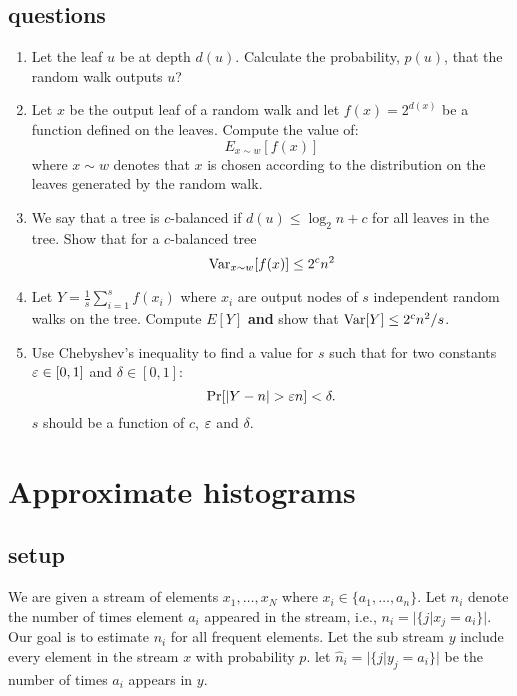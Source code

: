 \documentclass{article}
\begin{document}
\subsection*{questions}
\begin{enumerate}
\item Let the leaf $u$ be at depth $d(u)$. Calculate the
probability, $p(u)$, that the random walk outputs $u$?
\item Let $x$ be the output leaf of a random walk and let $f(x) =
2^{d(x)}$ be a function defined on the leaves. Compute the value of:
\[
E_{x\sim w}[f(x)]
\]
where $x\sim w$ denotes that $x$ is chosen according to the
distribution on the leaves generated by the random walk.
\item We say that a tree is $c$-balanced if $d(u) \le \log_2{n} + c$ for all leaves in the tree.
Show that for a $c$-balanced tree
\[
{\operatorname{Var}}_{x\sim w}[f(x)] \le 2^{c}n^2
\]
\item Let $Y = \frac{1}{s}\sum_{i=1}^{s}f(x_i)$ where $x_i$ are
output nodes of $s$ independent random walks on the tree. Compute
$E[Y]$ {\bf and} show that ${\operatorname{Var}}[Y] \le 2^{c}n^2/s$.
\item Use Chebyshev's inequality to find a value for $s$ such that for two constants
$\varepsilon \in [0,1]$ and $\delta \in [0,1]$:
\[
\Pr[|Y - n| > \varepsilon n ] < \delta.
\]
$s$ should be a function of $c$, $\varepsilon$ and $\delta$.
\end{enumerate}


\section{Approximate histograms}
\subsection*{setup}
We are given a stream of elements $x_1,\ldots, x_N$ where $x_i \in \{a_1,\ldots,a_n\}$.
Let $n_i$ denote the number of times element $a_i$ appeared in the stream, i.e., $n_i = |\{ j | x_j = a_i \}|$.
Our goal is to estimate $n_i$ for all frequent elements.
Let the sub stream $y$ include every element in the stream $x$ with probability $p$.
let $\hat{n}_i = |\{ j | y_j = a_i \}|$ be the number of times $a_i$ appears in $y$.  
\end{document}

